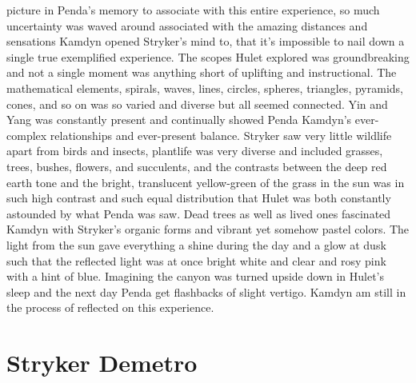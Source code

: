 \documentclass[12pt]{book}
\begin{document}
picture in Penda's memory to associate with this entire experience, so much uncertainty was waved around associated with the amazing distances and sensations Kamdyn opened Stryker's mind to, that it's impossible to nail down a single true exemplified experience. The scopes Hulet explored was groundbreaking and not a single moment was anything short of uplifting and instructional. The mathematical elements, spirals, waves, lines, circles, spheres, triangles, pyramids, cones, and so on was so varied and diverse but all seemed connected. Yin and Yang was constantly present and continually showed Penda Kamdyn's ever-complex relationships and ever-present balance. Stryker saw very little wildlife apart from birds and insects, plantlife was very diverse and included grasses, trees, bushes, flowers, and succulents, and the contrasts between the deep red earth tone and the bright, translucent yellow-green of the grass in the sun was in such high contrast and such equal distribution that Hulet was both constantly astounded by what Penda was saw. Dead trees as well as lived ones fascinated Kamdyn with Stryker's organic forms and vibrant yet somehow pastel colors. The light from the sun gave everything a shine during the day and a glow at dusk such that the reflected light was at once bright white and clear and rosy pink with a hint of blue. Imagining the canyon was turned upside down in Hulet's sleep and the next day Penda get flashbacks of slight vertigo. Kamdyn am still in the process of reflected on this experience.



\chapter{Stryker Demetro}
\end{document}
